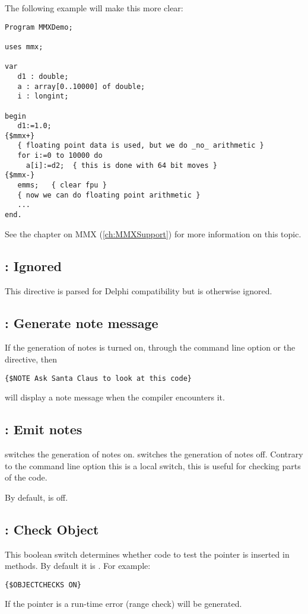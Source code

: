 The following example will make this more clear:
\begin{verbatim}
Program MMXDemo;

uses mmx;

var
   d1 : double;
   a : array[0..10000] of double;
   i : longint;

begin
   d1:=1.0;
{$mmx+}
   { floating point data is used, but we do _no_ arithmetic }
   for i:=0 to 10000 do
     a[i]:=d2;  { this is done with 64 bit moves }
{$mmx-}
   emms;   { clear fpu }
   { now we can do floating point arithmetic }
   ...
end.
\end{verbatim}
See the chapter on MMX (\ref{ch:MMXSupport}) for more information
on this topic.

\subsection{ : Ignored}
This directive is parsed for Delphi compatibility but is otherwise ignored.

\subsection{ : Generate note message}

If the generation of notes is turned on, through the  command line
option or the  directive, then
\begin{verbatim}
{$NOTE Ask Santa Claus to look at this code}
\end{verbatim}
will display a note message when the compiler encounters it.


\subsection{ : Emit notes}

 switches the generation of notes on.
 switches the generation of notes off.
Contrary to the command line option  this is a local switch,
this is useful for checking parts of the code.

By default,  is off.

\subsection{ : Check Object}
This boolean switch determines whether code to test the  
pointer is inserted in methods. By default it is . For example:
\begin{verbatim}
{$OBJECTCHECKS ON}
\end{verbatim}
If the  pointer is  a run-time error  
(range check) will be generated.


